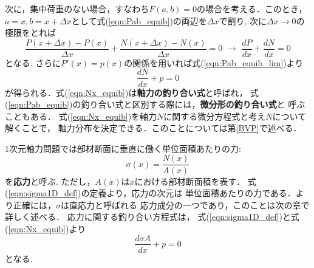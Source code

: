 \documentclass[11pt,a4j]{mybook2}
\begin{document}
次に，集中荷重のない場合，すなわち$F(a,b)=0$の場合を考える．このとき，
$a=x, b=x+\Delta x$として式(\ref{eqn:Pab_equib})の両辺を$\Delta x$で割り, 
次に$\Delta x\rightarrow 0$の極限をとれば
\begin{equation}
	\frac{P(x+\Delta x)-P(x)}{\Delta x}+\frac{N(x+\Delta x)-N(x)}{\Delta x}=0 \,\,
	\rightarrow
	\, \,
	\frac{dP}{dx}+\frac{dN}{dx}=0
	\label{eqn:Pab_equib_lim}
\end{equation}
となる. さらに$P'(x)=p(x)$の関係を用いれば式(\ref{eqn:Pab_equib_lim})より
\begin{equation}
	\frac{dN}{dx}+p=0
	\label{eqn:Nx_equib}
\end{equation}
が得られる．式(\ref{eqn:Nx_equib})は{\rm \bf 軸力の釣り合い式}と呼ばれ，
式(\ref{eqn:Pab_equib})の釣り合い式と区別する際には，{\rm \bf 微分形の釣り合い式}と
呼ぶこともある．
式(\ref{eqn:Nx_equib})を軸力$N$に関する微分方程式と考え$N$について解くことで，
軸力分布を決定できる．このことについては第\ref{BVP}で述べる．

1次元軸力問題では部材断面に垂直に働く単位面積あたりの力:
\begin{equation}
	\sigma(x) = \frac{N(x)}{A(x)}
	\label{eqn:sigma1D_def}
\end{equation}
を{\rm \bf 応力}と呼ぶ. ただし，$A(x)$は$x$における部材断面積を表す．
式(\ref{eqn:sigma1D_def})の定義より，応力の次元は
単位面積あたりの力である．より正確には，$\sigma$は直応力と呼ばれる
応力成分の一つであり，このことは次の章で詳しく述べる．
応力に関する釣り合い方程式は，
式(\ref{eqn:sigma1D_def})と式(\ref{eqn:Nx_equib})より
\begin{equation}
	\frac{d\sigma A}{dx}+p=0
	\label{eqn:sigx_equib}
\end{equation}
となる.
\end{document}

